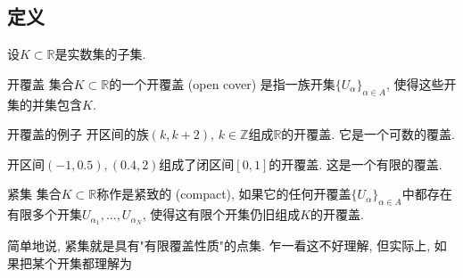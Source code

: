 \subsection{定义}
设$K\subset\mathbb{R}$是实数集的子集.
\begin{definition}{开覆盖}
集合$K\subset\mathbb{R}$的一个开覆盖 (open cover) 是指一族开集$\{U_{\alpha}\}_{\alpha\in A}$, 使得这些开集的并集包含$K$.
\end{definition}

\begin{example}{开覆盖的例子}
开区间的族$(k,k+2),\,k\in\mathbb{Z}$组成$\mathbb{R}$的开覆盖. 它是一个可数的覆盖.

开区间$(-1,0.5),(0.4,2)$组成了闭区间$[0,1]$的开覆盖. 这是一个有限的覆盖.
\end{example}

\begin{definition}{紧集}
集合$K\subset\mathbb{R}$称作是紧致的 (compact), 如果它的任何开覆盖$\{U_{\alpha}\}_{\alpha\in A}$中都存在有限多个开集$U_{\alpha_1},...,U_{\alpha_N}$, 使得这有限个开集仍旧组成$K$的开覆盖. 
\end{definition}

简单地说, 紧集就是具有"有限覆盖性质"的点集. 乍一看这不好理解, 但实际上, 如果把某个开集都理解为